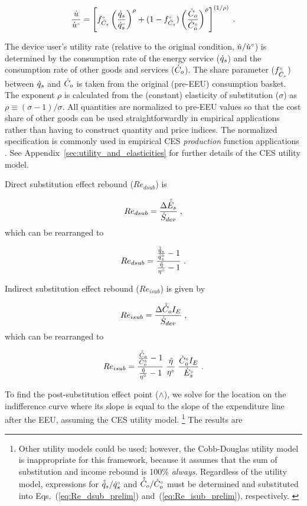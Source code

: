 \documentclass[12pt]{article}\usepackage[]{graphicx}\usepackage[]{xcolor}
\begin{document}
\begin{equation} \label{eq:ces_utility}
  \frac{\dot{u}}{{}{\dot{u}}^{\scriptscriptstyle \circ}} = \left[ {}{f}^{\scriptscriptstyle \circ}_{\dot{C}_s} \left( \frac{\dot{q}_s}{{}{\dot{q}}^{\scriptscriptstyle \circ}_s} \right)^\rho + (1-{}{f}^{\scriptscriptstyle \circ}_{\dot{C}_s}) \left( \frac{\dot{C}_o}{{}{\dot{C}}^{\scriptscriptstyle \circ}_o} \right)^\rho \right]^{(1/\rho)}{} \; .
\end{equation}

The device user's utility rate
(relative to the original condition, $\dot{u}/{}{\dot{u}}^{\scriptscriptstyle \circ}$)
is determined by
the consumption rate of the energy service ($\dot{q}_s$) and
the consumption rate of other goods and services ($\dot{C}_o$).
The share parameter (${}{f}^{\scriptscriptstyle \circ}_{\dot{C}_s}$) 
between $\dot{q}_s$ and $\dot{C}_o$
is taken from the original (pre-EEU) consumption basket.
The exponent $\rho$ is calculated from the (constant) 
elasticity of substitution ($\sigma$) 
as $\rho \equiv (\sigma - 1)/\sigma$.
All quantities are normalized to pre-EEU values so that
the cost share of other goods can be used straightforwardly 
in empirical applications rather than having
to construct quantity and price indices.
The normalized specification is commonly used in empirical CES \emph{production}
function applications \citep{Klump2012,Temple2012,Gechert2021}.
See Appendix~\ref{sec:utility_and_elasticities}
for further details of the CES utility model.

Direct substitution effect rebound ($Re_{dsub}$) is

\begin{equation} \label{eq:Re_dsub_def}
  Re_{dsub} = \frac{\Delta \hat{\dot{E}}_s}{\dot{S}_{dev}} \; ,
\end{equation}
%
which can be rearranged to

\begin{equation} \label{eq:Re_dsub_prelim}
  Re_{dsub} = \frac{\frac{\hat{\dot{q}}_s}{{}{\dot{q}}^{\scriptscriptstyle \circ}_s} - 1}{\frac{\tilde{\eta}}{{}{\eta}^{\scriptscriptstyle \circ}} - 1} \; .
\end{equation}

Indirect substitution effect rebound ($Re_{isub}$) is given by

\begin{equation} \label{eq:Re_isub_def}
  Re_{isub} = \frac{\Delta \hat{\dot{C}}_o I_E}{\dot{S}_{dev}} \; ,
\end{equation}
%
which can be rearranged to 

\begin{equation} \label{eq:Re_isub_prelim}
  Re_{isub} = \frac{\frac{\hat{\dot{C}}_o}{{}{\dot{C}}^{\scriptscriptstyle \circ}_o} - 1}{\frac{\tilde{\eta}}{{}{\eta}^{\scriptscriptstyle \circ}} - 1} \; 
                          \frac{\tilde{\eta}}{{}{\eta}^{\scriptscriptstyle \circ}} \; 
                          \frac{{}{\dot{C}}^{\scriptscriptstyle \circ}_o I_E}{{}{\dot{E}}^{\scriptscriptstyle \circ}_s} \; .
\end{equation}

To find the post-substitution effect point ($\wedge$),
we solve for the location on the indifference curve
where its slope is equal to the slope of the
expenditure line after the EEU, 
assuming the CES utility model.%
\footnote{
  Other utility models could be used; however, 
  the Cobb-Douglas utility model is inappropriate for this framework, 
  because it assumes that the sum 
  of substitution and income rebound is 100\% \emph{always}.
  Regardless of the utility model, expressions for
  $\hat{\dot{q}}_s/{}{\dot{q}}^{\scriptscriptstyle \circ}_s$ and
  $\hat{\dot{C}}_o/{}{\dot{C}}^{\scriptscriptstyle \circ}_o$
  must be determined
  and substituted into Eqs.~(\ref{eq:Re_dsub_prelim}) and~(\ref{eq:Re_isub_prelim}), 
  respectively.
  \label{fn:other_utility_models}
}
%
The results are
\end{document}
